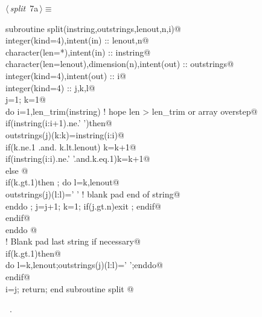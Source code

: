 \documentclass[10pt,a4paper,notitlepage]{article}
\begin{document}
\begin{flushleft} \small
\begin{minipage}{\linewidth}\label{scrap5}\raggedright\small
{} $\langle\,${\it split}\nobreak\ {\footnotesize {7a}}$\,\rangle\equiv$
\vspace{-1ex}
\begin{list}{}{} \item
\mbox{}\verb@      subroutine split(instring,outstrings,lenout,n,i)@\\
\mbox{}\verb@      integer(kind=4),intent(in) :: lenout,n@\\
\mbox{}\verb@      character(len=*),intent(in) :: instring@\\
\mbox{}\verb@      character(len=lenout),dimension(n),intent(out) :: outstrings@\\
\mbox{}\verb@      integer(kind=4),intent(out) :: i@\\
\mbox{}\verb@      integer(kind=4) :: j,k,l@\\
\mbox{}\verb@      j=1; k=1@\\
\mbox{}\verb@      do i=1,len_trim(instring) ! hope len > len_trim or array overstep@\\
\mbox{}\verb@      if(instring(i:i+1).ne.'  ')then@\\
\mbox{}\verb@       outstrings(j)(k:k)=instring(i:i)@\\
\mbox{}\verb@       if(k.ne.1 .and. k.lt.lenout) k=k+1@\\
\mbox{}\verb@       if(instring(i:i).ne.' '.and.k.eq.1)k=k+1@\\
\mbox{}\verb@      else @\\
\mbox{}\verb@       if(k.gt.1)then ; do l=k,lenout@\\
\mbox{}\verb@         outstrings(j)(l:l)=' ' ! blank pad end of string@\\
\mbox{}\verb@       enddo ; j=j+1; k=1;  if(j.gt.n)exit ; endif@\\
\mbox{}\verb@      endif@\\
\mbox{}\verb@      enddo    @\\
\mbox{}\verb@! Blank pad last string if necessary@\\
\mbox{}\verb@      if(k.gt.1)then@\\
\mbox{}\verb@       do l=k,lenout;outstrings(j)(l:l)=' ';enddo@\\
\mbox{}\verb@      endif@\\
\mbox{}\verb@      i=j; return;  end subroutine split                                     @{\NWsep}
\end{list}
\vspace{-1.5ex}
\footnotesize
\begin{list}{}{\setlength{\itemsep}{-\parsep}\setlength{\itemindent}{-\leftmargin}}
\item \NWtxtMacroRefIn\ .

\item{}
\end{list}
\end{minipage}\vspace{4ex}
\end{flushleft}
\end{document}
